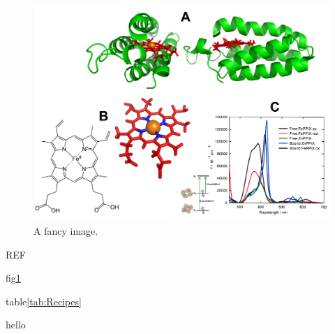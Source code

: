 \documentclass{NEWSTYLE}
\begin{document}
\begin{center}
\begin{figure}[!ht]
	\centering
	\includegraphics[width=1.0\textwidth]{Images/haemStructure.png}
	\caption[Haem Structure]{A fancy image.}
	\label{fig:haemStructure}
\end{figure}
\end{center}

REF

fig\ref{fig:haemStructure}

table\ref{tab:Recipes}



hello\cite{Gazit2002,Channon2009,Horcas2007,Jones2003,Parsons2010,Stott2009}


\end{document}
